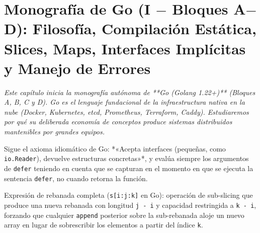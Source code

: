\documentclass{book}
\begin{document}
\chapter{Monografía de Go (I \(-\) Bloques A\(-\)D): Filosofía, Compilación Estática, Slices, Maps, Interfaces Implícitas y Manejo de Errores}
\label{chap:cap05-go-fundamentos-slices-interfaces-errores-genericos}

\noindent\textit{Este capítulo inicia la monografía autónoma de **Go (Golang 1.22+)** (Bloques A, B, C y D). Go es el lenguaje fundacional de la infraestructura nativa en la nube (Docker, Kubernetes, etcd, Prometheus, Terraform, Caddy). Estudiaremos por qué su deliberada economía de conceptos produce sistemas distribuidos mantenibles por grandes equipos.}

\begin{tcolorbox}[title={Consejo}, studiumtip, breakable]

Sigue el axioma idiomático de Go: *«Acepta interfaces (pequeñas, como \texttt{io.Reader}), devuelve estructuras concretas»*, y evalúa siempre los argumentos de \texttt{defer} teniendo en cuenta que se capturan en el momento en que se ejecuta la sentencia \texttt{defer}, no cuando retorna la función.
\end{tcolorbox}

\begin{tcolorbox}[title={Definición}, studiumdef, breakable]

Expresión de rebanada completa (\texttt{s[i:j:k]} en Go): operación de sub-slicing que produce una nueva rebanada con longitud \texttt{j - i} y capacidad restringida a \texttt{k - i}, forzando que cualquier \texttt{append} posterior sobre la sub-rebanada aloje un nuevo array en lugar de sobrescribir los elementos a partir del índice \texttt{k}.
\end{tcolorbox}
\end{document}
